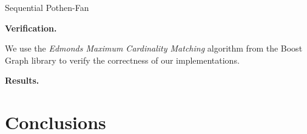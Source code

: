 \documentclass[letterpaper]{article}
\newcommand{\mypar}[1]{{\bf #1.}}
\begin{document}
Sequential Pothen-Fan

\mypar{Verification}

We use the \textit{Edmonds Maximum Cardinality Matching} algorithm \cite{BoostEdmonds} from the Boost Graph library  to verify the correctness of our implementations.

\mypar{Results}
%

%

\section{Conclusions}
\end{document}
